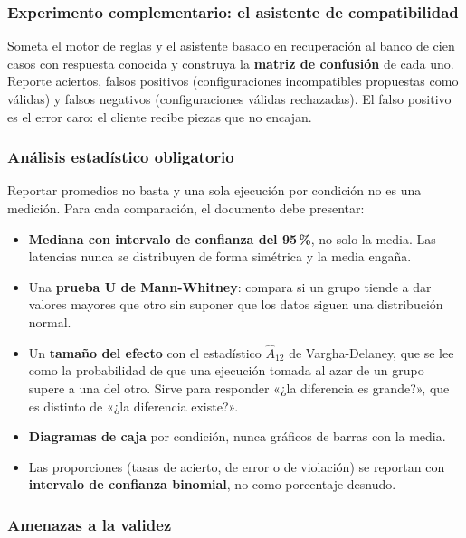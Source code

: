 \documentclass[11pt,a4paper]{article}
\begin{document}
	\subsubsection{Experimento complementario: el asistente de compatibilidad}
	
	Someta el motor de reglas y el asistente basado en recuperación al banco de cien casos con respuesta conocida y construya la \textbf{matriz de confusión} de cada uno. Reporte aciertos, falsos positivos (configuraciones incompatibles propuestas como válidas) y falsos negativos (configuraciones válidas rechazadas). El falso positivo es el error caro: el cliente recibe piezas que no encajan.
	
	\subsubsection{Análisis estadístico obligatorio}
	
	Reportar promedios no basta y una sola ejecución por condición no es una medición. Para cada comparación, el documento debe presentar:
	
	\begin{itemize}[leftmargin=*,itemsep=4pt]
		\item \textbf{Mediana con intervalo de confianza del 95\,\%}, no solo la media. Las latencias nunca se distribuyen de forma simétrica y la media engaña.
		\item Una \textbf{prueba U de Mann-Whitney}: compara si un grupo tiende a dar valores mayores que otro sin suponer que los datos siguen una distribución normal.
		\item Un \textbf{tamaño del efecto} con el estadístico $\hat{A}_{12}$ de Vargha-Delaney, que se lee como la probabilidad de que una ejecución tomada al azar de un grupo supere a una del otro. Sirve para responder «¿la diferencia es grande?», que es distinto de «¿la diferencia existe?».
		\item \textbf{Diagramas de caja} por condición, nunca gráficos de barras con la media.
		\item Las proporciones (tasas de acierto, de error o de violación) se reportan con \textbf{intervalo de confianza binomial}, no como porcentaje desnudo.
	\end{itemize}
	
	\subsubsection{Amenazas a la validez}
	
\end{document}
